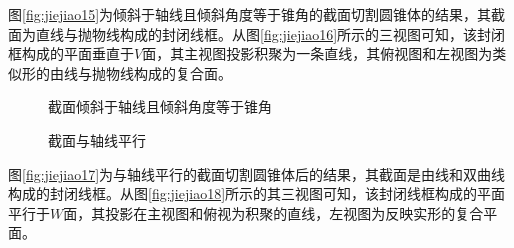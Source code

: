 图\ref{fig:jiejiao15}为倾斜于轴线且倾斜角度等于锥角的截面切割圆锥体的结果，其截面为直线与抛物线构成的封闭线框。从图\ref{fig:jiejiao16}所示的三视图可知，该封闭框构成的平面垂直于$V$面，其主视图投影积聚为一条直线，其俯视图和左视图为类似形的由线与抛物线构成的复合面。
\begin{figure}[htbp]
\centering
{}\hspace{60pt}
\caption{截面倾斜于轴线且倾斜角度等于锥角}
\end{figure}


\begin{figure}[htbp]
\centering
{}\hspace{60pt}
\caption{截面与轴线平行}
\end{figure}
图\ref{fig:jiejiao17}为与轴线平行的截面切割圆锥体后的结果，其截面是由线和双曲线构成的封闭线框。从图\ref{fig:jiejiao18}所示的其三视图可知，该封闭线框构成的平面平行于$W$面，其投影在主视图和俯视为积聚的直线，左视图为反映实形的复合平面。
\endinput
 